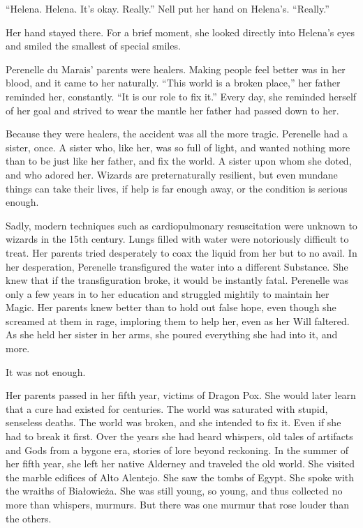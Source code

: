 “Helena. Helena. It’s okay. Really.” Nell put her hand on Helena’s. “Really.”

Her hand stayed there. For a brief moment, she looked directly into Helena’s eyes and smiled the smallest of special smiles.

Perenelle du Marais’ parents were healers. Making people feel better was in her blood, and it came to her naturally. “This world is a broken place,” her father reminded her, constantly. “It is our role to fix it.” Every day, she reminded herself of her goal and strived to wear the mantle her father had passed down to her.

Because they were healers, the accident was all the more tragic. Perenelle had a sister, once. A sister who, like her, was so full of light, and wanted nothing more than to be just like her father, and fix the world. A sister upon whom she doted, and who adored her. Wizards are preternaturally resilient, but even mundane things can take their lives, if help is far enough away, or the condition is serious enough.

Sadly, modern techniques such as cardiopulmonary resuscitation were unknown to wizards in the 15th century. Lungs filled with water were notoriously difficult to treat. Her parents tried desperately to coax the liquid from her but to no avail. In her desperation, Perenelle transfigured the water into a different Substance. She knew that if the transfiguration broke, it would be instantly fatal. Perenelle was only a few years in to her education and struggled mightily to maintain her Magic. Her parents knew better than to hold out false hope, even though she screamed at them in rage, imploring them to help her, even as her Will faltered. As she held her sister in her arms, she poured everything she had into it, and more.

It was not enough.

Her parents passed in her fifth year, victims of Dragon Pox. She would later learn that a cure had existed for centuries. The world was saturated with stupid, senseless deaths. The world was broken, and she intended to fix it. Even if she had to break it first. Over the years she had heard whispers, old tales of artifacts and Gods from a bygone era, stories of lore beyond reckoning. In the summer of her fifth year, she left her native Alderney and traveled the old world. She visited the marble edifices of Alto Alentejo. She saw the tombs of Egypt. She spoke with the wraiths of Białowieża. She was still young, so young, and thus collected no more than whispers, murmurs. But there was one murmur that rose louder than the others.

